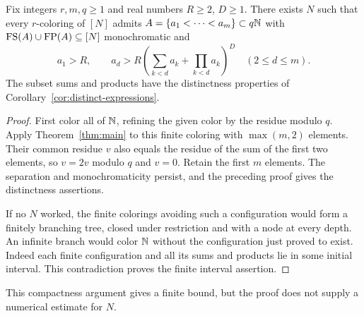 \begin{corollary}
\label{cor:finite-interval}
Fix integers $r,m,q\ge1$ and real numbers $R\ge2$, $D\ge1$.
There exists $N$ such that every $r$-coloring of $[N]$ admits
$A=\{a_1<\cdots<a_m\}\subset q\mathbb N$ with
$\operatorname{FS}(A)\cup\operatorname{FP}(A)\subseteq[N]$ monochromatic and
\[
 a_1>R,\qquad
 a_d>R\left(\sum_{k<d}a_k+\prod_{k<d}a_k\right)^D
 \quad(2\le d\le m).
\]
The subset sums and products have the distinctness properties of
Corollary~\ref{cor:distinct-expressions}.
\end{corollary}

\begin{proof}
First color all of $\mathbb N$, refining the given color by the residue
modulo $q$. Apply Theorem~\ref{thm:main} to this finite coloring
with $\max(m,2)$ elements. Their common residue $v$ also equals
the residue of the sum of the first two elements, so $v=2v$
modulo $q$ and $v=0$. Retain the first $m$ elements. The
separation and monochromaticity persist, and the preceding proof
gives the distinctness assertions.

If no $N$ worked, the finite colorings avoiding such a configuration
would form a finitely branching tree, closed under restriction and
with a node at every depth. An infinite branch would color $\mathbb N$
without the configuration just proved to exist. Indeed each finite
configuration and all its sums and products lie in some initial
interval. This contradiction proves the finite interval assertion.
\end{proof}

This compactness argument gives a finite bound, but the proof does
not supply a numerical estimate for $N$.
